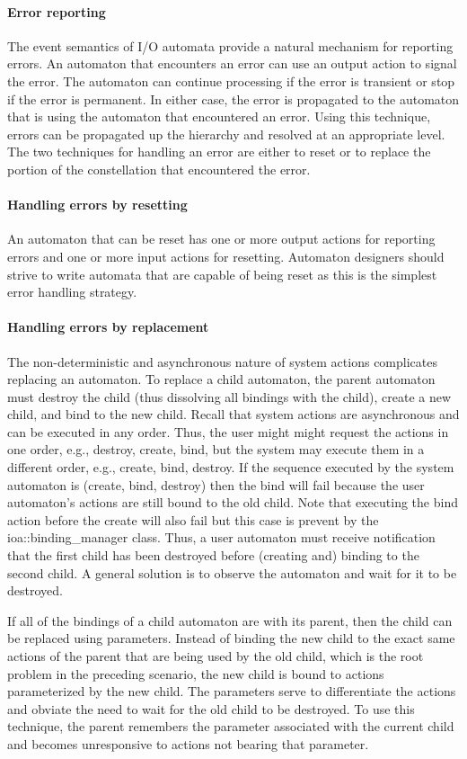 \paragraph*{Error reporting}
The event semantics of I/O automata provide a natural mechanism for reporting errors.
An automaton that encounters an error can use an output action to signal the error.
The automaton can continue processing if the error is transient or stop if the error is permanent.
In either case, the error is propagated to the automaton that is using the automaton that encountered an error.
Using this technique, errors can be propagated up the hierarchy and resolved at an appropriate level.
The two techniques for handling an error are either to reset or to replace the portion of the constellation that encountered the error.

\paragraph*{Handling errors by resetting}
An automaton that can be reset has one or more output actions for reporting errors and one or more input actions for resetting.
Automaton designers should strive to write automata that are capable of being reset as this is the simplest error handling strategy.

\paragraph*{Handling errors by replacement}
The non-deterministic and asynchronous nature of system actions complicates replacing an automaton.
To replace a child automaton, the parent automaton must destroy the child (thus dissolving all bindings with the child), create a new child, and bind to the new child.
Recall that system actions are asynchronous and can be executed in any order.
Thus, the user might might request the actions in one order, e.g., destroy, create, bind, but the system may execute them in a different order, e.g., create, bind, destroy.
If the sequence executed by the system automaton is (create, bind, destroy) then the bind will fail because the user automaton's actions are still bound to the old child.
Note that executing the bind action before the create will also fail but this case is prevent by the ioa::binding\_manager class.
Thus, a user automaton must receive notification that the first child has been destroyed before (creating and) binding to the second child.
A general solution is to observe the automaton and wait for it to be destroyed.

If all of the bindings of a child automaton are with its parent, then the child can be replaced using parameters.
Instead of binding the new child to the exact same actions of the parent that are being used by the old child, which is the root problem in the preceding scenario, the new child is bound to actions parameterized by the new child.
The parameters serve to differentiate the actions and obviate the need to wait for the old child to be destroyed.
To use this technique, the parent remembers the parameter associated with the current child and becomes unresponsive to actions not bearing that parameter.

